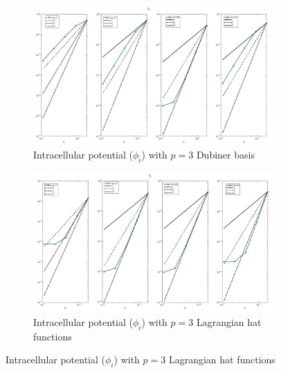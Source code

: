 \documentclass[a4paper,11pt]{article}
\begin{document}
\begin{figure}[H]
\caption{Comparison of the intracellular potential ($\phi_i$)}
\label{phii_3}
\begin{subfigure}{\textwidth}
\begin{center}
\includegraphics[width = \textwidth]{./D3_Phii_1.jpg}
\caption{Intracellular potential ($\phi_i$) with $p=3$ Dubiner basis}
\end{center}
\end{subfigure}
\begin{subfigure}{\textwidth}
\begin{center}
\includegraphics[width =\textwidth]{./P3_Phii_1.jpg}
\caption{Intracellular potential ($\phi_i$) with $p=3$ Lagrangian hat functions}
\end{center}
\end{subfigure}
\end{figure}
\end{document}
